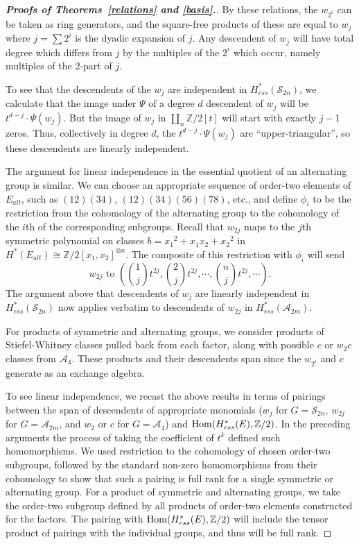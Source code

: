 \documentclass{article}
\theoremstyle{plain}
\theoremstyle{definition}
\newcommand{\Z}{\mathbb{Z}}
\newcommand{\si}{\mathcal{S}}
\newcommand{\alt}{\mathcal{A}}
\begin{document}
\begin{proof}[{\bf Proofs of Theorems~\ref{relations} and \ref{basis}.}]
By these relations,
the $w_{2^i}$ can be taken as ring generators, and the square-free
products of these are equal to $w_j$ where $j = \sum 2^i$ is the
dyadic expansion of $j$.
Any descendent of $w_j$ 
will have total degree which differs from $j$ by
the multiples of the $2^i$ which occur, namely 
multiples of the $2$-part
of $j$. 

To see that the descendents of the $w_j$ are independent in $H^*_{ess}(\si_{2n} )$, 
we calculate that 
the image under $\Psi$ of a degree $d$ descendent of $w_j$ will be $t^{d-j} \cdot \Psi(w_j)$.  
But the image of  $w_j$ in $\coprod_n  \Z/2[t]$ will start
with exactly $j-1$ zeros. Thus, collectively in degree $d$, 
the $t^{d-j} \cdot \Psi(w_j)$ are  ``upper-triangular'', so
these descendents are linearly independent.

The argument for linear independence in the essential quotient of an alternating group is similar.  We can choose an
appropriate sequence of order-two 
elements of $E_{alt}$, such
as $(12)(34)$, $(12)(34)(56)(78)$, etc.,  and define 
$\phi_i$ to be the restriction from the cohomology of the
alternating group to the cohomology of the $i$th of the corresponding subgroups.
Recall that $w_{2j}$ maps to the $j$th symmetric polynomial
on classes $b = {x_1}^2 + x_1 x_2 + {x_2}^2$ in $H^*(E_{alt} ) 
\cong \Z/2[x_1, x_2]^{\otimes n}$.  The composite of this
restriction with $\phi_i$  will send 
 \[ w_{2j}  \text{  to }\left(\binom{1}{j} t^{2j}, \binom{2}{j} t^{2j}, \cdots, \binom{n}{j} t^{2j}, \cdots \right). \]
The argument above that descendents of $w_j$ are linearly independent
in $H^*_{ess}(\si_{2n})$ now applies verbatim to descendents 
of $w_{2j}$ in $H^*_{ess}(\alt_{2m} )$.


For products of symmetric and alternating groups, 
we consider products of Stiefel-Whitney classes pulled back from each factor, along
with possible $c$ or $w_2 c$ classes from $\alt_4$. These products and their descendents span since the $w_{2^i}$ and $c$ generate as an exchange algebra.

To see linear independence, we recast the above results in terms of pairings between the span of descendents 
of appropriate monomials ($w_j$ for $G = \si_{2n}$, $w_{2j}$ for $G = \alt_{2m}$, and $w_2$ or $c$ for $G = \alt_4$) and ${\rm Hom}(H^*_{ess}(E ), \Z/2)$. In the preceding arguments 
the process of taking the coefficient of $t^k$ defined
such homomorphisms.  
We used restriction to the cohomology of chosen order-two subgroups, 
followed by the standard non-zero homomorphisms from their cohomology to show that such a pairing is full rank for a single symmetric or alternating group. 
For a product of symmetric and alternating groups,
we take the order-two subgroup defined by all products of order-two elements constructed for the factors.  The pairing with ${\rm Hom}(H^*_{ess}(E), \Z/2 )$ will include
 the tensor product of pairings with the individual groups, and thus will be full rank.
\end{proof}
\end{document}
